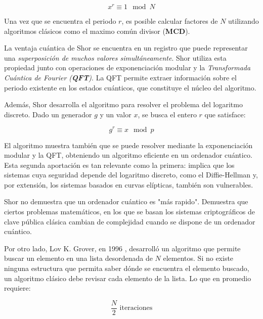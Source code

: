             \begin{equation}
                x^r \equiv 1 \mod N
            \end{equation}

            Una vez que se encuentra el periodo $r$, es posible calcular factores de $N$ utilizando algoritmos clásicos como el maximo común divisor (\textbf{MCD}). 

            La ventaja cuántica de Shor se encuentra en un registro que puede representar una \textit{superposición de muchos valores simultáneamente}. Shor utiliza
            esta propiedad junto con operaciones de exponenciación modular y la \textit{Transformada Cuántica de Fourier (\textbf{QFT})}. La QFT permite extraer
            información sobre el periodo existente en los estados cuánticos, que constituye el núcleo del algoritmo. 

            Además, Shor desarrolla el algoritmo para resolver el problema del logaritmo discreto. Dado un generador $g$ y un valor $x$, se busca el entero $r$ que satisface:
            
            \begin{equation}
                g^r \equiv x \mod p
            \end{equation}

            El algoritmo muestra también que se puede resolver mediante la exponenciación modular y la QFT, obteniendo un algoritmo eficiente en un ordenador cuántico. Esta segunda
            aportación es tan relevante como la primera: implica que los sistemas cuya seguridad depende del logaritmo discreto, como el Diffie-Hellman y, por extensión, los sistemas
            basados en curvas elípticas, también son vulnerables. 

            Shor no demuestra que un ordenador cuántico es "más rapido". Demuestra que ciertos problemas matemáticos, en los que se basan los sistemas criptográficos de clave pública
            clásica cambian de complejidad cuando se dispone de un ordenador cuántico. 

            Por otro lado, Lov K. Grover, en 1996 \cite{grover}, desarrolló un algoritmo que permite buscar un elemento en una lista desordenada de $N$ elementos. Si no existe ninguna estructura
            que permita saber dónde se encuentra el elemento buscado, un algoritmo clásico debe revisar cada elemento de la lista. Lo que en promedio requiere:

            \begin{equation}
                \frac{N}{2} \text{ iteraciones}
            \end{equation}

